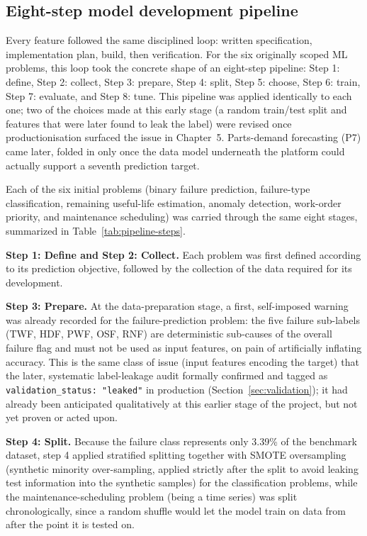 \subsection{Eight-step model development pipeline}

Every feature followed the same disciplined loop: written specification, implementation plan, build, then verification. For the six originally scoped ML problems, this loop took the concrete shape of an eight-step pipeline: Step 1: define, Step 2: collect, Step 3: prepare, Step 4: split, Step 5: choose, Step 6: train, Step 7: evaluate, and Step 8: tune. This pipeline was applied identically to each one; two of the choices made at this early stage (a random train/test split and features that were later found to leak the label) were revised once productionisation surfaced the issue in Chapter~5. Parts-demand forecasting (P7) came later, folded in only once the data model underneath the platform could actually support a seventh prediction target.

Each of the six initial problems (binary failure prediction, failure-type classification, remaining useful-life estimation, anomaly detection, work-order priority, and maintenance scheduling) was carried through the same eight stages, summarized in Table~\ref{tab:pipeline-steps}.

\textbf{Step 1: Define and Step 2: Collect.} Each problem was first defined according to its prediction objective, followed by the collection of the data required for its development.

\textbf{Step 3: Prepare.} At the data-preparation stage, a first, self-imposed warning was already recorded for the failure-prediction problem: the five failure sub-labels (TWF, HDF, PWF, OSF, RNF) are deterministic sub-causes of the overall failure flag and must not be used as input features, on pain of artificially inflating accuracy. This is the same class of issue (input features encoding the target) that the later, systematic label-leakage audit formally confirmed and tagged as \texttt{validation\_status: "leaked"} in production (Section~\ref{sec:validation}); it had already been anticipated qualitatively at this earlier stage of the project, but not yet proven or acted upon.

\textbf{Step 4: Split.} Because the failure class represents only 3.39\% of the benchmark dataset, step 4 applied stratified splitting together with SMOTE oversampling (synthetic minority over-sampling, applied strictly after the split to avoid leaking test information into the synthetic samples) for the classification problems, while the maintenance-scheduling problem (being a time series) was split chronologically, since a random shuffle would let the model train on data from after the point it is tested on.

